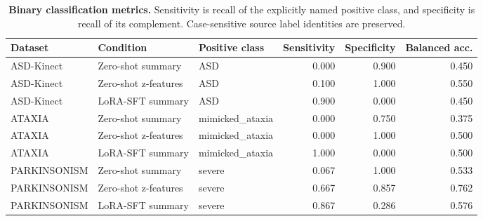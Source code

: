 \begin{table}[H]
\centering
\caption{\textbf{Binary classification metrics.} Sensitivity is recall of the explicitly named positive class, and specificity is recall of its complement. Case-sensitive source label identities are preserved.}
\label{tab:binary_metrics}
\small
\begin{adjustbox}{max width=\textwidth}
\begin{tabular}{lllrrr}
\toprule
Dataset & Condition & Positive class & Sensitivity & Specificity & Balanced acc. \\
\midrule
ASD-Kinect & Zero-shot summary & ASD & 0.000 & 0.900 & 0.450 \\
ASD-Kinect & Zero-shot z-features & ASD & 0.100 & 1.000 & 0.550 \\
ASD-Kinect & LoRA-SFT summary & ASD & 0.900 & 0.000 & 0.450 \\
ATAXIA & Zero-shot summary & mimicked\_ataxia & 0.000 & 0.750 & 0.375 \\
ATAXIA & Zero-shot z-features & mimicked\_ataxia & 0.000 & 1.000 & 0.500 \\
ATAXIA & LoRA-SFT summary & mimicked\_ataxia & 1.000 & 0.000 & 0.500 \\
PARKINSONISM & Zero-shot summary & severe & 0.067 & 1.000 & 0.533 \\
PARKINSONISM & Zero-shot z-features & severe & 0.667 & 0.857 & 0.762 \\
PARKINSONISM & LoRA-SFT summary & severe & 0.867 & 0.286 & 0.576 \\
\bottomrule
\end{tabular}
\end{adjustbox}
\end{table}
